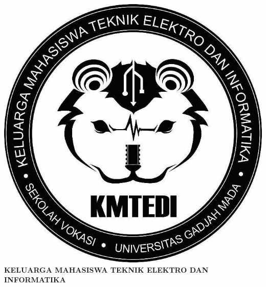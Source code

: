 \begin{titlepage}
    \begin{center}
        \begin{doublespace}
            \textbf{\MakeUppercase{\large{\judulid}}}\\
            \textbf{\MakeUppercase{\normalsize{\judulproyek}}}\\[2.5cm]
            
        \end{doublespace}
        \includegraphics[width=0.55\linewidth]{gambar/Logo_KMTEDI.png}\\[5cm]



        \textbf{\normalsize \MakeUppercase{Keluarga mahasiswa teknik elektro dan informatika}}\\
        \textbf{\normalsize \MakeUppercase{\departemen}}\\
        \textbf{\normalsize \MakeUppercase{\fakultas}}\\
        \textbf{\normalsize \MakeUppercase{\universitas}}\\
        \textbf{\normalsize \the\year{}}\\
    \end{center}
\end{titlepage}